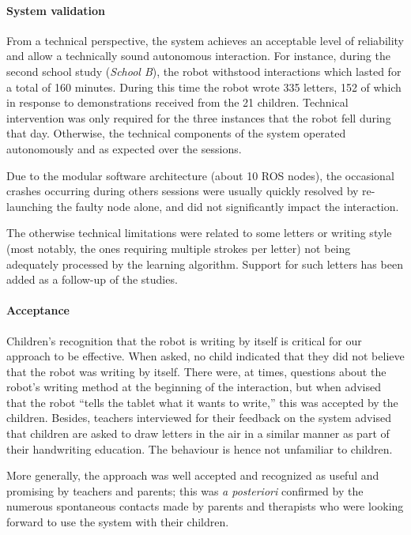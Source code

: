 \documentclass{article}
\begin{document}
\paragraph{System validation}

From a technical perspective, the system achieves an acceptable level of
reliability and allow a technically sound autonomous interaction. For instance,
during the second school study (\textit{School B}), the robot withstood
interactions which lasted for a total of 160 minutes.  During this time the
robot wrote 335 letters, 152 of which in response to demonstrations received
from the 21 children. Technical intervention was only required for the three
instances that the robot fell during that day.  Otherwise, the technical
components of the system operated autonomously and as expected over the
sessions.

Due to the modular software architecture (about 10 ROS nodes), the occasional
crashes occurring during others sessions were usually quickly resolved by
re-launching the faulty node alone, and did not significantly impact the
interaction.

The otherwise technical limitations were related to some letters or writing
style (most notably, the ones requiring multiple strokes per letter) not being
adequately processed by the learning algorithm. Support for such letters has
been added as a follow-up of the studies.

\paragraph{Acceptance}

Children's recognition that the robot is writing by itself is critical for our
approach to be effective. When asked, no child indicated that they did not
believe that the robot was writing by itself. There were, at times, questions
about the robot's writing method at the beginning of the interaction, but when
advised that the robot ``tells the tablet what it wants to write,'' this was
accepted by the children.  Besides, teachers interviewed for their feedback on
the system advised that children are asked to draw letters in the air in a
similar manner as part of their handwriting education. The behaviour is hence
not unfamiliar to children.

More generally, the approach was well accepted and recognized as useful and
promising by teachers and parents; this was \textit{a posteriori} confirmed by
the numerous spontaneous contacts made by parents and therapists who were
looking forward to use the system with their children.
\end{document}
